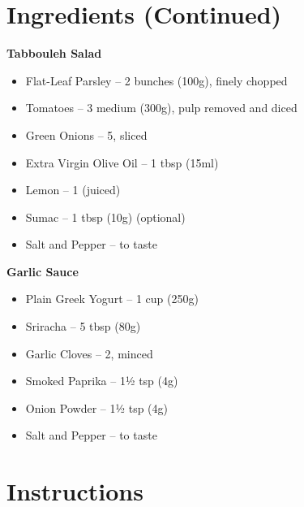 \newpage
{}
\section*{Ingredients (Continued)}

\textbf{Tabbouleh Salad}
\begin{itemize}[itemsep=0.1em, label={\raisebox{-0.1ex}{\large\textbullet}}]
      \item[\cut] Flat-Leaf Parsley – 2 bunches (100g), finely chopped
      \item[\cut] Tomatoes – 3 medium (300g), pulp removed and diced
      \item[\cut] Green Onions – 5, sliced
      \item[\measure] Extra Virgin Olive Oil – 1 tbsp (15ml)
      \item[\measure] Lemon – 1 (juiced)
      \item[\measure] Sumac – 1 tbsp (10g) (optional)
      \item Salt and Pepper – to taste
\end{itemize}

\textbf{Garlic Sauce}
\begin{itemize}[itemsep=0.1em, label={\raisebox{-0.1ex}{\large\textbullet}}]
      \item[\measure] Plain Greek Yogurt – 1 cup (250g)
      \item[\measure] Sriracha – 5 tbsp (80g)
      \item[\cut] Garlic Cloves – 2, minced
      \item[\measure] Smoked Paprika – 1½ tsp (4g)
      \item[\measure] Onion Powder – 1½ tsp (4g)
      \item Salt and Pepper – to taste
\end{itemize}

\newpage
{}
\section*{Instructions}

